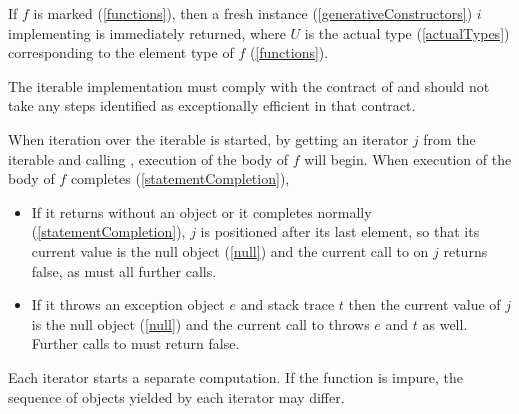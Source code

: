 \documentclass[makeidx]{article}
\begin{document}
{\LMHash{}%
If $f$ is marked \code{\SYNC*} (\ref{functions}),
then a fresh instance (\ref{generativeConstructors}) $i$
implementing  is immediately returned,
where $U$ is the actual type
(\ref{actualTypes})
corresponding to the element type of $f$
(\ref{functions}).


\LMHash{}%
The iterable implementation must comply with
the contract of  and should not
take any steps identified as exceptionally efficient in that contract.


\LMHash{}%
When iteration over the iterable is started, by getting
an iterator $j$ from the iterable and calling ,
execution of the body of $f$ will begin.
When execution of the body of $f$ completes (\ref{statementCompletion}),
\begin{itemize}
\item If it returns without an object or it completes normally
  (\ref{statementCompletion}),
  $j$ is positioned after its last element,
  so that its current value is the null object
  (\ref{null})
  and the current call to  on $j$ returns false,
  as must all further calls.
\item If it throws an exception object $e$ and stack trace $t$
  then the current value of $j$ is the null object
  (\ref{null})
  and the current call to  throws $e$ and $t$ as well.
  Further calls to  must return false.
\end{itemize}

\LMHash{}%
Each iterator starts a separate computation.
If the \code{\SYNC*} function is impure,
the sequence of objects yielded by each iterator may differ.

}
\end{document}
